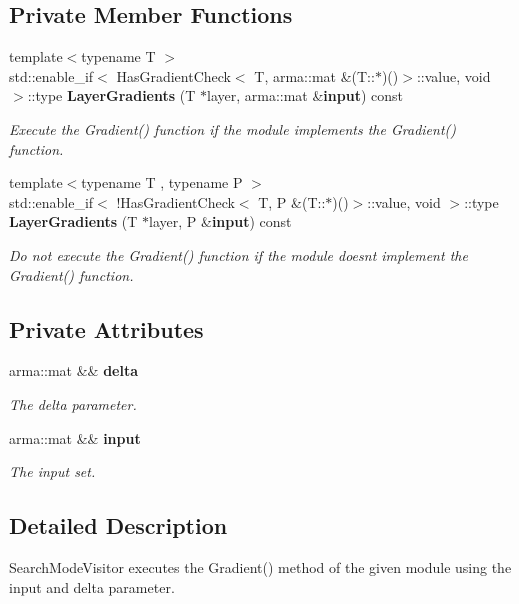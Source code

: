 \subsection*{Private Member Functions}
\begin{DoxyCompactItemize}
\item 
{\footnotesize template$<$typename T $>$ }\\std\+::enable\+\_\+if$<$ Has\+Gradient\+Check$<$ T, arma\+::mat \&(T\+::$\ast$)()$>$\+::value, void $>$\+::type {\bf Layer\+Gradients} (T $\ast$layer, arma\+::mat \&{\bf input}) const 
\begin{DoxyCompactList}\small\item\em Execute the Gradient() function if the module implements the Gradient() function. \end{DoxyCompactList}\item 
{\footnotesize template$<$typename T , typename P $>$ }\\std\+::enable\+\_\+if$<$ !Has\+Gradient\+Check$<$ T, P \&(T\+::$\ast$)()$>$\+::value, void $>$\+::type {\bf Layer\+Gradients} (T $\ast$layer, P \&{\bf input}) const 
\begin{DoxyCompactList}\small\item\em Do not execute the Gradient() function if the module doesn\textquotesingle{}t implement the Gradient() function. \end{DoxyCompactList}\end{DoxyCompactItemize}
\subsection*{Private Attributes}
\begin{DoxyCompactItemize}
\item 
arma\+::mat \&\& {\bf delta}
\begin{DoxyCompactList}\small\item\em The delta parameter. \end{DoxyCompactList}\item 
arma\+::mat \&\& {\bf input}
\begin{DoxyCompactList}\small\item\em The input set. \end{DoxyCompactList}\end{DoxyCompactItemize}


\subsection{Detailed Description}
Search\+Mode\+Visitor executes the Gradient() method of the given module using the input and delta parameter. 

